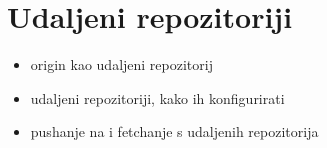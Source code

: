 \chapter*{Udaljeni repozitoriji}

\label{udaljeni_repozitoriji}

\begin{itemize}
   \item origin kao udaljeni repozitorij
   \item udaljeni repozitoriji, kako ih konfigurirati
   \item pushanje na i fetchanje s udaljenih repozitorija
\end{itemize}


